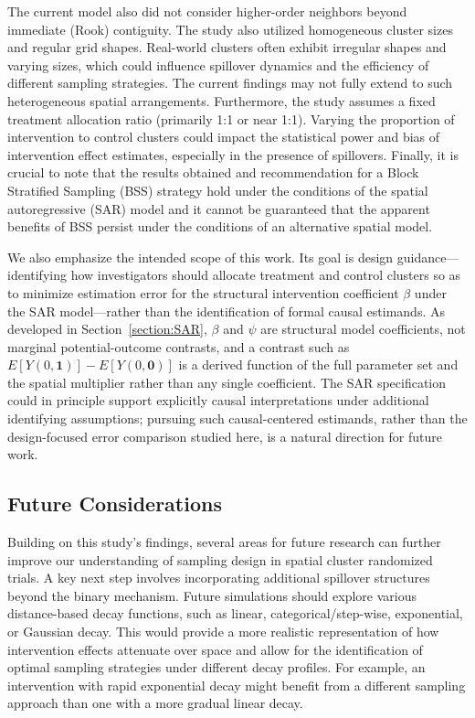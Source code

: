 \documentclass{article}[11pt]
\begin{document}
The current model also did not consider higher-order neighbors beyond immediate (Rook) contiguity. The study also utilized homogeneous cluster sizes and regular grid shapes. Real-world clusters often exhibit irregular shapes and varying sizes, which could influence spillover dynamics and the efficiency of different sampling strategies. The current findings may not fully extend to such heterogeneous spatial arrangements. Furthermore, the study assumes a fixed treatment allocation ratio (primarily 1:1 or near 1:1). Varying the proportion of intervention to control clusters could impact the statistical power and bias of intervention effect estimates, especially in the presence of spillovers. Finally, it is crucial to note that the results obtained and recommendation for a Block Stratified Sampling (BSS) strategy hold under the conditions of the spatial autoregressive (SAR) model and it cannot be guaranteed that the apparent benefits of BSS persist under the conditions of an alternative spatial model.

We also emphasize the intended scope of this work. Its goal is design guidance---identifying how investigators should allocate treatment and control clusters so as to minimize estimation error for the structural intervention coefficient $\beta$ under the SAR model---rather than the identification of formal causal estimands. As developed in Section~\ref{section:SAR}, $\beta$ and $\psi$ are structural model coefficients, not marginal potential-outcome contrasts, and a contrast such as $E[Y(0,\mathbf{1})] - E[Y(0,\mathbf{0})]$ is a derived function of the full parameter set and the spatial multiplier rather than any single coefficient. The SAR specification could in principle support explicitly causal interpretations under additional identifying assumptions; pursuing such causal-centered estimands, rather than the design-focused error comparison studied here, is a natural direction for future work.

\subsection{Future Considerations}\label{section:FutureConsiderations}

Building on this study's findings, several areas for future research can further improve our
understanding of sampling design in spatial cluster randomized trials. A key next step involves incorporating additional spillover structures beyond the binary mechanism. Future simulations should explore various distance-based decay functions, such
as linear, categorical/step-wise, exponential, or Gaussian decay. This would provide a more
realistic representation of how intervention effects attenuate over space and allow for the
identification of optimal sampling strategies under different decay profiles. For example, an
intervention with rapid exponential decay might benefit from a different sampling approach
than one with a more gradual linear decay.
\end{document}
